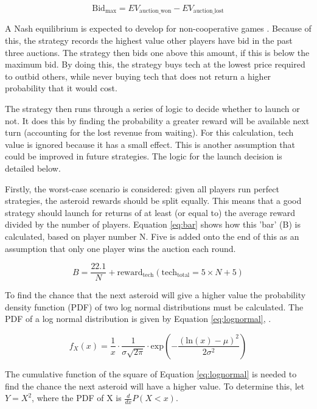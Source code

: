 \documentclass[11pt, twoside]{article}
\begin{document}
\begin{equation}
	\text{Bid}_{\text{max}}=EV_{\text{auction\_won}} - EV_{\text{auction\_lost}}
	\label{eq:bid}
\end{equation}

A Nash equilibrium is expected to develop for non-cooperative games \cite{nash1951non}. Because of this, the strategy records the highest value other players have bid in the past three auctions. The strategy then bids one above this amount, if this is below the maximum bid. By doing this, the strategy buys tech at the lowest price required to outbid others, while never buying tech that does not return a higher probability that it would cost.

The strategy then runs through a series of logic to decide whether to launch or not. It does this by finding the probability a greater reward will be available next turn (accounting for the lost revenue from waiting). For this calculation, tech value is ignored because it has a small effect. This is another assumption that could be improved in future strategies. The logic for the launch decision is detailed below.

Firstly, the worst-case scenario is considered: given all players run perfect strategies, the asteroid rewards should be split equally. This means that a good strategy should launch for returns of at least (or equal to) the average reward divided by the number of players. Equation \ref{eq:bar} shows how this 'bar' (B) is calculated, based on player number N. Five is added onto the end of this as an assumption that only one player wins the auction each round.

\begin{equation}
	\label{eq:bar}
	B= \dfrac{22.1}{N} + \text{reward}_{\text{tech}}(\text{tech}_\text{total}=5 \times N + 5)
\end{equation}

To find the chance that the next asteroid will give a higher value the probability density function (PDF) of two log normal distributions must be calculated. The PDF of a log normal distribution is given by Equation \ref{eq:lognormal}, \cite{kotz2004continuous}.

\begin{equation}
	f_{X}(x)=\frac{1}{x}\cdot\frac{1}{\sigma\sqrt{2\pi}}\cdot \text{exp}{\left(-\dfrac{(\text{ln}(x)-\mu)^2}{2\sigma^{2}}\right) }
	\label{eq:lognormal}
\end{equation}

The cumulative function of the square of Equation \ref{eq:lognormal} is needed to find the chance the next asteroid will have a higher value. To determine this, let $Y = X^2$, where the PDF of X is $\frac{d}{dx}P(X<x)$.
\end{document}
